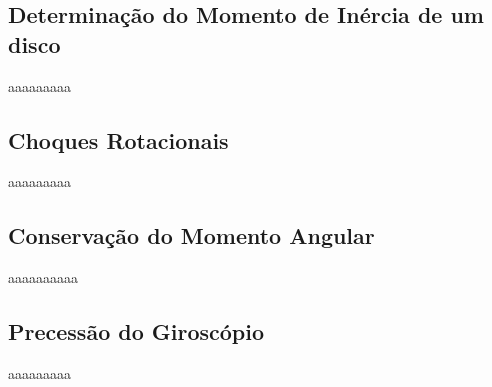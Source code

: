 
\subsection{Determinação do Momento de Inércia de um disco}
aaaaaaaaa


\subsection{Choques Rotacionais}
aaaaaaaaa


\subsection{Conservação do Momento Angular}
aaaaaaaaaa


\subsection{Precessão do Giroscópio}
aaaaaaaaa
